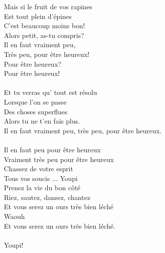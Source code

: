 Mais si le fruit de vos rapines\\
Est tout plein d'épines\\
C'est beaucoup moins bon!\\
Alors petit, as-tu compris?\\
Il en faut vraiment peu,\\
Très peu, pour être heureux!\\
Pour être heureux?\\
Pour être heureux!\\\\
Et tu verras qu' tout est résolu\\
Lorsque l'on se passe\\
Des choses superflues\\
Alors tu ne t'en fais plus.\\
Il en faut vraiment peu, très peu, pour être heureux.\\\\
Il en faut peu pour être heureux\\
Vraiment très peu pour être heureux\\
Chassez de votre esprit\\
Tous vos soucis ... Youpi\\
Prenez la vie du bon côté\\
Riez, sautez, dansez, chantez\\
Et vous serez un ours très bien léché\\
Waouh\\
Et vous serez un ours très bien léché.\\\\
Youpi!